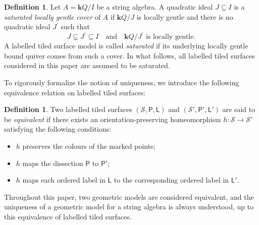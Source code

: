 \documentclass[11pt]{amsart}
\numberwithin{equation}{section}
\theoremstyle{definition}
\newtheorem{definition}[theorem]{Definition}
\begin{document}
\begin{definition}\label{def:saturated_model}
    Let $A = \mathbf{k}Q/I$ be a string algebra. A quadratic  ideal $J \subseteq I$ is a \textit{saturated locally gentle cover} of $A$ if $\mathbf{k}Q/J$ is locally gentle and there is no quadratic  ideal $J^\prime$ such that 
    \[J \subsetneq J^\prime \subseteq I \quad\text{and}\quad \mathbf{k}Q/J^\prime \text{ is locally gentle}.\]
    A labelled tiled surface model is called \textit{saturated} if its underlying locally gentle
bound quiver comes from such a cover. 
In what follows, all labelled tiled surfaces considered in this paper are assumed to be saturated.
\end{definition} 

To rigorously formalize the notion of uniqueness, we introduce the following equivalence relation on labelled tiled surfaces:

\begin{definition}\label{def:equivalence_models}
Two labelled tiled surfaces $(\mathcal{S}, \mathsf{P}, \mathsf{L})$ and $(\mathcal{S}', \mathsf{P}', \mathsf{L}')$ are said to be \emph{equivalent} if there exists an orientation-preserving homeomorphism $h: \mathcal{S} \rightarrow \mathcal{S}'$ satisfying the following conditions:
\begin{itemize}
    \item $h$ preserves the colours of the marked points;
    \item $h$ maps the dissection $\mathsf{P}$ to $\mathsf{P}';$
    \item $h$ maps each ordered label in $\mathsf{L}$ to the corresponding ordered label in $\mathsf{L}'.$
\end{itemize}

Throughout this paper, two geometric models are considered equivalent, and the uniqueness of a geometric model for a string algebra is always understood, up to this equivalence of labelled tiled surfaces.
\end{definition}
\end{document}
